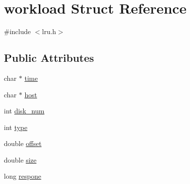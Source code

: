 \hypertarget{structworkload}{\section{workload Struct Reference}
\label{structworkload}
}


{\ttfamily \#include $<$lru.\+h$>$}

\subsection*{Public Attributes}
\begin{DoxyCompactItemize}
\item 
char $\ast$ \hyperlink{structworkload_a4401c89ba5cdd383f04301470e163cfd}{time}
\item 
char $\ast$ \hyperlink{structworkload_a3d757b51dfb82980f5a979a97bf0dfa1}{host}
\item 
int \hyperlink{structworkload_ac5fbfd8a1e652dc2b6e742ce685eb1fa}{disk\+\_\+num}
\item 
int \hyperlink{structworkload_aa2845ad1d10cf7ef276771aa7c038c40}{type}
\item 
double \hyperlink{structworkload_a05766e7402dae7d93f0f6602e4498a36}{offset}
\item 
double \hyperlink{structworkload_a5a1b5a6bbc572a36211bb56219e41d2e}{size}
\item 
long \hyperlink{structworkload_a8de001cbb458db8f4502435a2a6c2030}{respone}
\end{DoxyCompactItemize}


